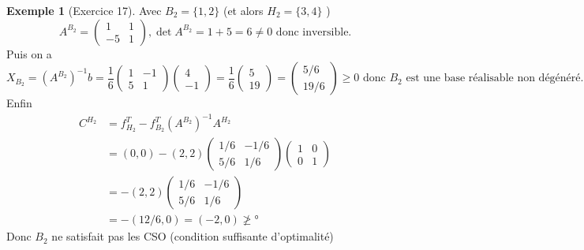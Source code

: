 \documentclass{article}
\theoremstyle{plain}%
\theoremstyle{definition}
\newtheorem{exmp}{Exemple}[section]
\theoremstyle{remark}
\begin{document}
\begin{exmp}[Exercice 17]
    Avec  $ B_2 = \{1,2\} $ (et alors $ H_2=\{3,4\} $ )
    \[
        A^{B_2} = \begin{pmatrix} 1 & 1 \\ -5 & 1\end{pmatrix}, \det A^{B_2} = 1 + 5 = 6 \neq 0 \text{ donc inversible}
    .\]
    Puis on a 
    \[
        X_{B_2} = (A^{B_2})^{-1}b = \frac{1}{6}\begin{pmatrix}1 & -1 \\5 & 1 \end{pmatrix} \begin{pmatrix}4 \\-1 \end{pmatrix} = \frac{1}{6}\begin{pmatrix} 5 \\ 19 \end{pmatrix} = \begin{pmatrix} 5/6 \\ 19/6 \end{pmatrix} \geq 0 \text{ donc }B_2 \text{ est une base réalisable non dégénéré}
    .\]
    Enfin 
    \begin{align*}
        C^{H_2} &= f^T_{H_2} - f^T_{B_2} (A^{B_2})^{-1} A^{H_2} \\
                &= (0,0) - (2,2) \begin{pmatrix}
                    1/6 & -1/6 \\
                    5/6 & 1/6 
                \end{pmatrix} \begin{pmatrix}
                    1 & 0 \\
                    0 & 1
                \end{pmatrix} \\
                &= - (2,2) \begin{pmatrix}
                    1/6 & -1/6 \\ 5/6 & 1/6
                \end{pmatrix} \\
                &= -(12/6, 0) = (-2, 0) \not \geq °
    \end{align*}
    Donc $ B_2 $ ne satisfait pas les CSO (condition suffisante d'optimalité)


\end{exmp}
\end{document}
